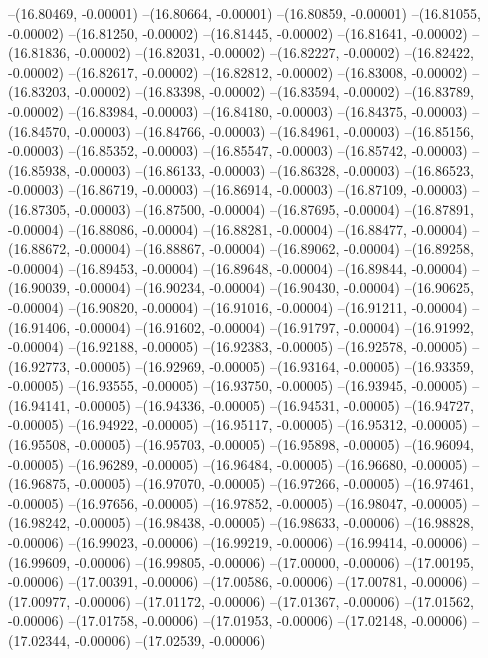 --(16.80469, -0.00001)
--(16.80664, -0.00001)
--(16.80859, -0.00001)
--(16.81055, -0.00002)
--(16.81250, -0.00002)
--(16.81445, -0.00002)
--(16.81641, -0.00002)
--(16.81836, -0.00002)
--(16.82031, -0.00002)
--(16.82227, -0.00002)
--(16.82422, -0.00002)
--(16.82617, -0.00002)
--(16.82812, -0.00002)
--(16.83008, -0.00002)
--(16.83203, -0.00002)
--(16.83398, -0.00002)
--(16.83594, -0.00002)
--(16.83789, -0.00002)
--(16.83984, -0.00003)
--(16.84180, -0.00003)
--(16.84375, -0.00003)
--(16.84570, -0.00003)
--(16.84766, -0.00003)
--(16.84961, -0.00003)
--(16.85156, -0.00003)
--(16.85352, -0.00003)
--(16.85547, -0.00003)
--(16.85742, -0.00003)
--(16.85938, -0.00003)
--(16.86133, -0.00003)
--(16.86328, -0.00003)
--(16.86523, -0.00003)
--(16.86719, -0.00003)
--(16.86914, -0.00003)
--(16.87109, -0.00003)
--(16.87305, -0.00003)
--(16.87500, -0.00004)
--(16.87695, -0.00004)
--(16.87891, -0.00004)
--(16.88086, -0.00004)
--(16.88281, -0.00004)
--(16.88477, -0.00004)
--(16.88672, -0.00004)
--(16.88867, -0.00004)
--(16.89062, -0.00004)
--(16.89258, -0.00004)
--(16.89453, -0.00004)
--(16.89648, -0.00004)
--(16.89844, -0.00004)
--(16.90039, -0.00004)
--(16.90234, -0.00004)
--(16.90430, -0.00004)
--(16.90625, -0.00004)
--(16.90820, -0.00004)
--(16.91016, -0.00004)
--(16.91211, -0.00004)
--(16.91406, -0.00004)
--(16.91602, -0.00004)
--(16.91797, -0.00004)
--(16.91992, -0.00004)
--(16.92188, -0.00005)
--(16.92383, -0.00005)
--(16.92578, -0.00005)
--(16.92773, -0.00005)
--(16.92969, -0.00005)
--(16.93164, -0.00005)
--(16.93359, -0.00005)
--(16.93555, -0.00005)
--(16.93750, -0.00005)
--(16.93945, -0.00005)
--(16.94141, -0.00005)
--(16.94336, -0.00005)
--(16.94531, -0.00005)
--(16.94727, -0.00005)
--(16.94922, -0.00005)
--(16.95117, -0.00005)
--(16.95312, -0.00005)
--(16.95508, -0.00005)
--(16.95703, -0.00005)
--(16.95898, -0.00005)
--(16.96094, -0.00005)
--(16.96289, -0.00005)
--(16.96484, -0.00005)
--(16.96680, -0.00005)
--(16.96875, -0.00005)
--(16.97070, -0.00005)
--(16.97266, -0.00005)
--(16.97461, -0.00005)
--(16.97656, -0.00005)
--(16.97852, -0.00005)
--(16.98047, -0.00005)
--(16.98242, -0.00005)
--(16.98438, -0.00005)
--(16.98633, -0.00006)
--(16.98828, -0.00006)
--(16.99023, -0.00006)
--(16.99219, -0.00006)
--(16.99414, -0.00006)
--(16.99609, -0.00006)
--(16.99805, -0.00006)
--(17.00000, -0.00006)
--(17.00195, -0.00006)
--(17.00391, -0.00006)
--(17.00586, -0.00006)
--(17.00781, -0.00006)
--(17.00977, -0.00006)
--(17.01172, -0.00006)
--(17.01367, -0.00006)
--(17.01562, -0.00006)
--(17.01758, -0.00006)
--(17.01953, -0.00006)
--(17.02148, -0.00006)
--(17.02344, -0.00006)
--(17.02539, -0.00006)
